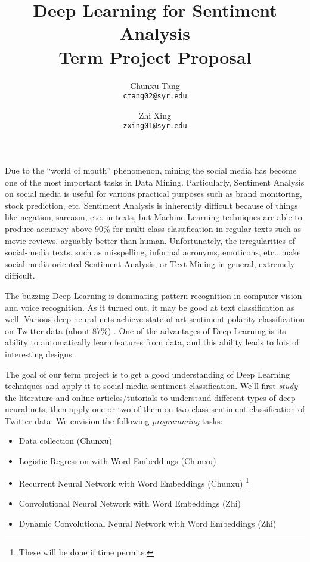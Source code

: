 \documentclass[11pt, letterpaper]{article}
\begin{document}
\title{Deep Learning for Sentiment Analysis\\
Term Project Proposal}
\author{Chunxu Tang\\
{\tt ctang02@syr.edu}
\and
Zhi Xing\\
{\tt zxing01@syr.edu}}
\date{}
\maketitle

Due to the ``world of mouth'' phenomenon, mining the social media has become one of the most important tasks in Data Mining. Particularly, Sentiment Analysis on social media is useful for various practical purposes such as brand monitoring, stock prediction, etc. 
Sentiment Analysis is inherently difficult because of things like negation, sarcasm, etc. in texts, but Machine Learning techniques are able to produce accuracy above 90\% for multi-class classification in regular texts such as movie reviews, arguably better than human. Unfortunately, the irregularities of social-media texts, such as misspelling, informal acronyms, emoticons, etc., make social-media-oriented Sentiment Analysis, or Text Mining in general, extremely difficult. 

The buzzing Deep Learning is dominating pattern recognition in computer vision and voice recognition. As it turned out, it may be good at text classification as well. Various deep neural nets achieve state-of-art sentiment-polarity classification on Twitter data (about 87\%) \cite{kalchbrenner2014, kim2014, wang2015}. One of the advantages of Deep Learning is its ability to automatically learn features from data, and this ability leads to lots of interesting designs \cite{dos2014, kalchbrenner2014, kim2014, socher2013, wang2015}.

The goal of our term project is to get a good understanding of Deep Learning techniques and apply it to social-media sentiment classification. We'll first {\em study} the literature and online articles/tutorials to understand different types of deep neural nets, then apply one or two of them on two-class sentiment classification of Twitter data. We envision the following {\em programming} tasks:
\begin{itemize}
\item Data collection (Chunxu)
\item Logistic Regression with Word Embeddings (Chunxu)
\item Recurrent Neural Network with Word Embeddings (Chunxu) \footnote{\label{ext}These will be done if time permits.}
\item Convolutional Neural Network with Word Embeddings (Zhi)
\item Dynamic Convolutional Neural Network with Word Embeddings (Zhi) 
\end{itemize}

\nocite{*}
{\fontsize{9pt}{10pt}\selectfont


}
\end{document}
